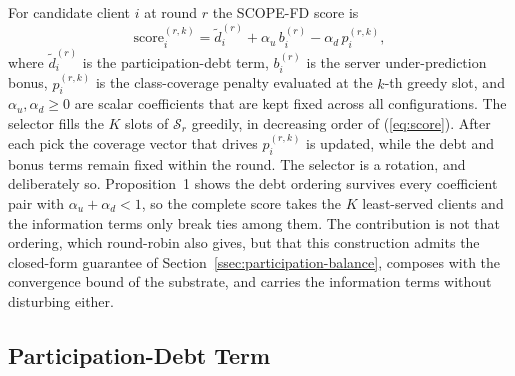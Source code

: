 \documentclass[journal]{IEEEtran}
\newcommand{\rev}[1]{{\color{blue}#1}}
\begin{document}
For candidate client $i$ at round $r$ the SCOPE-FD score is
\begin{equation}
\text{score}_i^{(r,k)} = \tilde{d}_i^{(r)} + \alpha_u\, b_i^{(r)} - \alpha_d\, p_i^{(r,k)},
\label{eq:score}
\end{equation}
where $\tilde{d}_i^{(r)}$ is the participation-debt term, $b_i^{(r)}$ is the server under-prediction bonus, $p_i^{(r,k)}$ is the class-coverage penalty evaluated at the $k$-th greedy slot, and $\alpha_u, \alpha_d \ge 0$ are scalar coefficients that are kept fixed across all configurations. The selector fills the $K$ slots of $\mathcal{S}_r$ greedily, in decreasing order of (\ref{eq:score}). After each pick the coverage vector that drives $p_i^{(r,k)}$ is updated, while the debt and bonus terms remain fixed within the round. \rev{The selector is a rotation, and deliberately so. Proposition~1 shows the debt ordering survives every coefficient pair with $\alpha_u + \alpha_d < 1$, so the complete score takes the $K$ least-served clients and the information terms only break ties among them. The contribution is not that ordering, which round-robin also gives, but that this construction admits the closed-form guarantee of Section~\ref{ssec:participation-balance}, composes with the convergence bound of the substrate, and carries the information terms without disturbing either.}

\subsection{Participation-Debt Term}
\label{ssec:debt-term}
\end{document}
